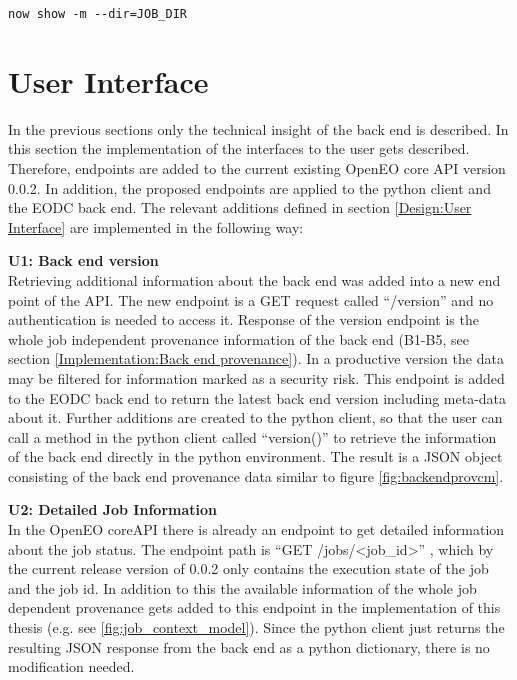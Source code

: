 \documentclass[draft,final]{vutinfth} %
\begin{document}
\begin{lstlisting}[frame=single]
now show -m --dir=JOB_DIR
\end{lstlisting}

\section{User Interface}\label{Implementation:User Interface}
In the previous sections only the technical insight of the back end is described. In this section the implementation of the interfaces to the user gets described. Therefore, endpoints are added to the current existing OpenEO core API version 0.0.2. In addition, the proposed endpoints are applied to the python client and the EODC back end. The relevant additions defined in section \ref{Design:User Interface} are implemented in the following way:

\textbf{U1: Back end version} \\
Retrieving additional information about the back end was added into a new end point of the API. The new endpoint is a GET request called “/version” and no authentication is needed to access it. Response of the version endpoint is the whole job independent provenance information of the back end (B1-B5, see section \ref{Implementation:Back end provenance}). In a productive version the data may be filtered for information marked as a security risk. This endpoint is added to the EODC back end to return the latest back end version including meta-data about it. Further additions are created to the python client, so that the user can call a method in the python client called “version()” to retrieve the information of the back end directly in the python environment. The result is a JSON object consisting of the back end provenance data similar to figure \ref{fig:backendprovcm}.

\textbf{U2: Detailed Job Information} \\
In the OpenEO coreAPI there is already an endpoint to get detailed information about the job status. The endpoint path is “GET /jobs/<job\_id>” , which by the current release version of 0.0.2 only contains the execution state of the job and the job id. In addition to this the available information of the whole job dependent provenance gets added to this endpoint in the implementation of this thesis (e.g. see \ref{fig:job_context_model}). Since the python client just returns the resulting JSON response from the back end as a python dictionary, there is no modification needed.
\end{document}
